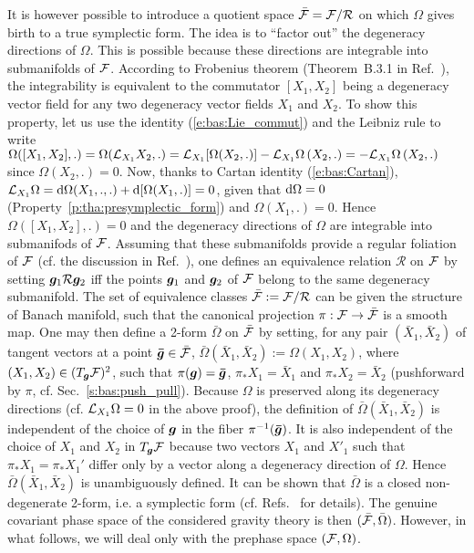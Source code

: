 It is however possible to introduce a quotient space $\bar{\mathcal{F}} = \mathcal{F} / \mathcal{R}$
on which $\Omega$ gives birth to a true symplectic form.
The idea is to ``factor out'' the  degeneracy directions of $\Omega$. This is
possible because these directions are integrable into
submanifolds of $\mathcal{F}$. According to Frobenius theorem
(Theorem~B.3.1 in Ref.~\cite{Wald84}), the integrability is equivalent to
the commutator $[X_1,X_2]$ being a degeneracy vector field for any two
degeneracy vector fields $X_1$ and $X_2$. To show this property, let us
use the
identity (\ref{e:bas:Lie_commut}) and the Leibniz rule to write
$\Omega([X_1, X_2], .) = \Omega( \mathcal{L}_{X_1} X_2, .) =
\mathcal{L}_{X_1} [\Omega(X_2, .)] - \mathcal{L}_{X_1} \Omega \, (X_2, .) =
- \mathcal{L}_{X_1} \Omega \, (X_2, .)$ since $\Omega(X_2, .) = 0$. Now, thanks to Cartan identity (\ref{e:bas:Cartan}),
$\mathcal{L}_{X_1} \Omega = \mathrm{d}\Omega (X_1,.,.) + \mathrm{d}[\Omega(X_1, .)] = 0$,
given that $\mathrm{d}\Omega = 0$ (Property~\ref{p:tha:presymplectic_form}) and
$\Omega(X_1, .) = 0$. Hence $\Omega([X_1, X_2], .) = 0$
and the degeneracy directions of $\Omega$ are integrable into
submanifods of $\mathcal{F}$. Assuming that these submanifolds provide a regular
foliation of $\mathcal{F}$ (cf. the discussion in Ref.~\cite{LeeW90}), one defines
an equivalence relation $\mathcal{R}$ on $\mathcal{F}$ by setting $\bm{g}_1\mathcal{R} \bm{g}_2$
iff the points $\bm{g}_1$ and $\bm{g}_2$ of $\mathcal{F}$ belong to the same
degeneracy submanifold. The set of equivalence classes $\bar{\mathcal{F}} := \mathcal{F} / \mathcal{R}$
can be given the structure of Banach manifold, such that the canonical projection
$\pi: \mathcal{F} \to \bar{\mathcal{F}}$ is a smooth map. One may then define
a 2-form $\bar{\Omega}$ on $\bar{\mathcal{F}}$ by setting, for any pair $(\bar{X}_1,\bar{X}_2)$
of tangent vectors at a point $\bm{\bar{g}}\in\bar{\mathcal{F}}$,
$\bar{\Omega}(\bar{X}_1, \bar{X}_2) := \Omega(X_1, X_2)$, where
$(X_1,X_2) \in (T_{\bm{g}}\mathcal{F})^2$, such that $\pi(\bm{g}) = \bm{\bar{g}}$,
$\pi_* X_1 = \bar{X}_1$ and $\pi_* X_2 = \bar{X}_2$ (pushforward by $\pi$,
cf. Sec.~\ref{s:bas:push_pull}).
Because $\Omega$ is preserved along its degeneracy directions (cf.
$\mathcal{L}_{X_1} \Omega = 0$ in the above proof), the definition
of $\bar{\Omega}(\bar{X}_1, \bar{X}_2)$ is independent of the choice
of $\bm{g}$ in the fiber $\pi^{-1}(\bm{\bar{g}})$. It is also independent
of the choice of $X_1$ and $X_2$ in $T_{\bm{g}}\mathcal{F}$ because
two vectors $X_1$ and $X'_1$ such that $\pi_* X_1 = \pi_* X_1'$ differ
only by a vector along a degeneracy direction of $\Omega$. Hence
$\bar{\Omega}(\bar{X}_1, \bar{X}_2)$ is unambiguously  defined. It can be shown
that $\bar{\Omega}$ is a closed non-degenerate 2-form, i.e.
a symplectic form (cf. Refs.~\cite{HarloW20,LeeW90} for details).
The genuine covariant phase space of the considered gravity theory
is then $(\bar{\mathcal{F}},\bar{\Omega})$. However, in what follows, we will deal
only with the prephase space $(\mathcal{F},\Omega)$.

